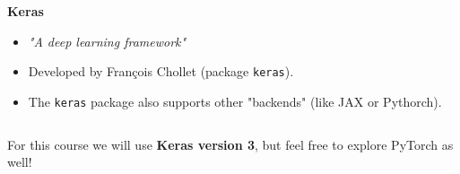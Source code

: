 \documentclass[9pt, aspectratio=169]{beamer}
\begin{document}
\begin{frame}
\begin{columns}
\begin{column}{.7\textwidth}
            \textbf{Keras}
            \begin{itemize}
                \item \textit{"A deep learning framework"}
                \item Developed by Fran\c{c}ois Chollet (package \texttt{keras}).
                \item The \texttt{keras} package also supports other "backends" (like JAX or Pythorch).
            \end{itemize}
        \end{column}
    \end{columns}
    \raggedright

    \vspace{1em}
    \centering
    For this course we will use \textbf{Keras version 3}, but feel free to explore PyTorch as well!
\end{frame}
\end{document}
